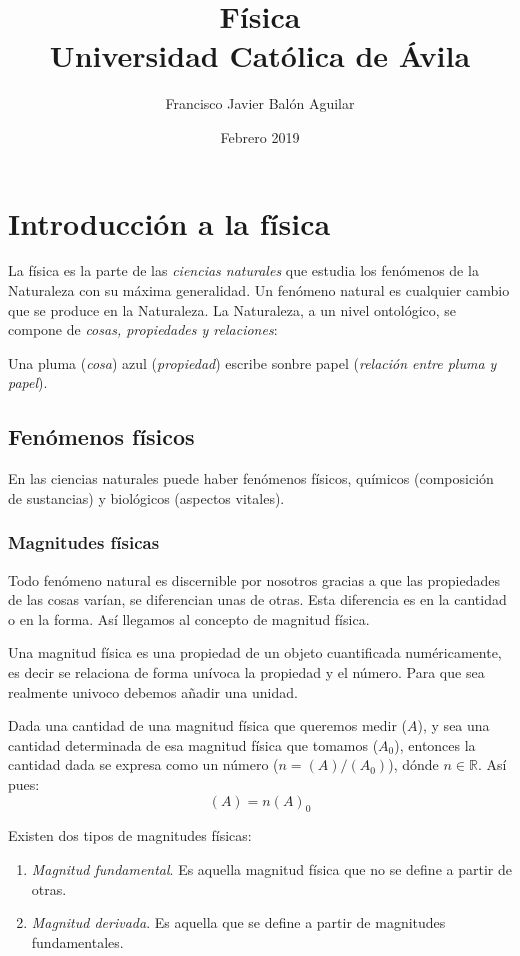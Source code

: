\documentclass[11pt, oneside, titlepage]{article}
\title{\textbf{Física}\\ Universidad Católica de Ávila}
\author{Francisco Javier Balón Aguilar}
\date{Febrero 2019}
\begin{document}
\maketitle
\tableofcontents
\newpage

\section{Introducción a la física}
La física es la parte de las \emph{ciencias naturales} que estudia los fenómenos de la Naturaleza con su máxima generalidad. Un fenómeno natural es cualquier cambio que se produce en la Naturaleza. La Naturaleza, a un nivel ontológico, se compone de \emph{cosas, propiedades y relaciones}:

\begin{center}Una pluma (\emph{cosa}) azul (\emph{propiedad}) escribe sonbre papel (\emph{relación entre pluma y papel}).\end{center}

\subsection{Fenómenos físicos}
En las ciencias naturales puede haber fenómenos físicos, químicos (composición de sustancias) y biológicos (aspectos vitales). 

\subsubsection{Magnitudes físicas}
Todo fenómeno natural es discernible por nosotros gracias a que las propiedades de las cosas varían, se diferencian unas de otras. Esta diferencia es en la cantidad o en la forma. Así llegamos al concepto de magnitud física.

Una magnitud física es una propiedad de un objeto cuantificada numéricamente, es decir se relaciona de forma unívoca la propiedad y el número. Para que sea realmente univoco debemos añadir una unidad.

Dada una cantidad de una magnitud física que queremos medir ($A$), y sea una cantidad determinada de esa magnitud física que tomamos ($A_0$), entonces la cantidad dada se expresa como un número ($n = (A)/(A_0)$), dónde $n \in \mathds{R}$. Así pues:
\[
(A) = n(A)_0
\]

Existen dos tipos de magnitudes físicas:
\begin{enumerate}
\item \emph{Magnitud fundamental}. Es aquella magnitud física que no se define a partir de otras.
\item \emph{Magnitud derivada}. Es aquella que se define a partir de magnitudes fundamentales.
\end{enumerate}
\end{document}
